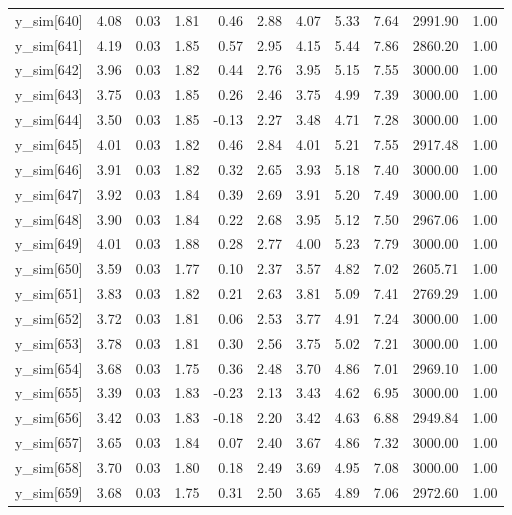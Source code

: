 \begin{table}[ht]
\begin{tabular}{rrrrrrrrrrr}
  y\_sim[640] & 4.08 & 0.03 & 1.81 & 0.46 & 2.88 & 4.07 & 5.33 & 7.64 & 2991.90 & 1.00 \\ 
  y\_sim[641] & 4.19 & 0.03 & 1.85 & 0.57 & 2.95 & 4.15 & 5.44 & 7.86 & 2860.20 & 1.00 \\ 
  y\_sim[642] & 3.96 & 0.03 & 1.82 & 0.44 & 2.76 & 3.95 & 5.15 & 7.55 & 3000.00 & 1.00 \\ 
  y\_sim[643] & 3.75 & 0.03 & 1.85 & 0.26 & 2.46 & 3.75 & 4.99 & 7.39 & 3000.00 & 1.00 \\ 
  y\_sim[644] & 3.50 & 0.03 & 1.85 & -0.13 & 2.27 & 3.48 & 4.71 & 7.28 & 3000.00 & 1.00 \\ 
  y\_sim[645] & 4.01 & 0.03 & 1.82 & 0.46 & 2.84 & 4.01 & 5.21 & 7.55 & 2917.48 & 1.00 \\ 
  y\_sim[646] & 3.91 & 0.03 & 1.82 & 0.32 & 2.65 & 3.93 & 5.18 & 7.40 & 3000.00 & 1.00 \\ 
  y\_sim[647] & 3.92 & 0.03 & 1.84 & 0.39 & 2.69 & 3.91 & 5.20 & 7.49 & 3000.00 & 1.00 \\ 
  y\_sim[648] & 3.90 & 0.03 & 1.84 & 0.22 & 2.68 & 3.95 & 5.12 & 7.50 & 2967.06 & 1.00 \\ 
  y\_sim[649] & 4.01 & 0.03 & 1.88 & 0.28 & 2.77 & 4.00 & 5.23 & 7.79 & 3000.00 & 1.00 \\ 
  y\_sim[650] & 3.59 & 0.03 & 1.77 & 0.10 & 2.37 & 3.57 & 4.82 & 7.02 & 2605.71 & 1.00 \\ 
  y\_sim[651] & 3.83 & 0.03 & 1.82 & 0.21 & 2.63 & 3.81 & 5.09 & 7.41 & 2769.29 & 1.00 \\ 
  y\_sim[652] & 3.72 & 0.03 & 1.81 & 0.06 & 2.53 & 3.77 & 4.91 & 7.24 & 3000.00 & 1.00 \\ 
  y\_sim[653] & 3.78 & 0.03 & 1.81 & 0.30 & 2.56 & 3.75 & 5.02 & 7.21 & 3000.00 & 1.00 \\ 
  y\_sim[654] & 3.68 & 0.03 & 1.75 & 0.36 & 2.48 & 3.70 & 4.86 & 7.01 & 2969.10 & 1.00 \\ 
  y\_sim[655] & 3.39 & 0.03 & 1.83 & -0.23 & 2.13 & 3.43 & 4.62 & 6.95 & 3000.00 & 1.00 \\ 
  y\_sim[656] & 3.42 & 0.03 & 1.83 & -0.18 & 2.20 & 3.42 & 4.63 & 6.88 & 2949.84 & 1.00 \\ 
  y\_sim[657] & 3.65 & 0.03 & 1.84 & 0.07 & 2.40 & 3.67 & 4.86 & 7.32 & 3000.00 & 1.00 \\ 
  y\_sim[658] & 3.70 & 0.03 & 1.80 & 0.18 & 2.49 & 3.69 & 4.95 & 7.08 & 3000.00 & 1.00 \\ 
  y\_sim[659] & 3.68 & 0.03 & 1.75 & 0.31 & 2.50 & 3.65 & 4.89 & 7.06 & 2972.60 & 1.00 \\ 

\end{tabular}
\end{table}
